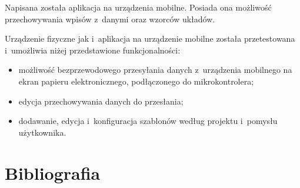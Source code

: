 \documentclass[a4paper,12pt, twoside]{article}
\begin{document}
    	Napisana została aplikacja na urządzenia mobilne. Posiada ona możliwość przechowywania wpisów z~danymi oraz wzorców układów.
    	
    	Urządzenie fizyczne jak i~aplikacja na urządzenie mobilne została przetestowana i~umożliwia niżej przedstawione funkcjonalności:
    	\begin{itemize}
    	    \item możliwość bezprzewodowego przesyłania danych z~urządzenia mobilnego na ekran papieru elektronicznego, podłączonego do mikrokontrolera;
    	    \item edycja przechowywania danych do przesłania;
    	    \item dodawanie, edycja i~konfiguracja szablonów według projektu i~pomysłu użytkownika.
    	\end{itemize}
    	
       
        \newpage
    	\leavevmode\thispagestyle{empty}\newpage
    	\section{Bibliografia}
    	
\end{document}

